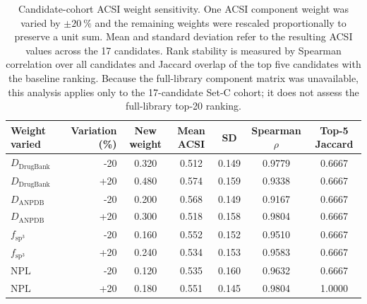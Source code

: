
\begin{table}[htbp]
\centering
\caption{Candidate-cohort ACSI weight sensitivity. One ACSI component weight was varied by $\pm\qty{20}{\percent}$ and the remaining weights were rescaled proportionally to preserve a unit sum. Mean and standard deviation refer to the resulting ACSI values across the \num{17} candidates. Rank stability is measured by Spearman correlation over all candidates and Jaccard overlap of the top five candidates with the baseline ranking. Because the full-library component matrix was unavailable, this analysis applies only to the 17-candidate Set-C cohort; it does not assess the full-library top-20 ranking.}
\label{tab:s4_acsi_sensitivity}
\scriptsize
\begin{tabular}{l r S[table-format=1.3] S[table-format=1.3] S[table-format=1.3] S[table-format=1.4] S[table-format=1.4]}
\toprule
Weight varied & Variation (\%) & {New weight} & {Mean ACSI} & {SD} & {Spearman $\rho$} & {Top-5 Jaccard} \\
\midrule
$D_{\mathrm{DrugBank}}$ & -20 & 0.320 & 0.512 & 0.149 & 0.9779 & 0.6667 \\
$D_{\mathrm{DrugBank}}$ & +20 & 0.480 & 0.574 & 0.159 & 0.9338 & 0.6667 \\
$D_{\mathrm{ANPDB}}$    & -20 & 0.200 & 0.568 & 0.149 & 0.9167 & 0.6667 \\
$D_{\mathrm{ANPDB}}$    & +20 & 0.300 & 0.518 & 0.158 & 0.9804 & 0.6667 \\
$f_{\mathrm{sp}^3}$      & -20 & 0.160 & 0.552 & 0.152 & 0.9510 & 0.6667 \\
$f_{\mathrm{sp}^3}$      & +20 & 0.240 & 0.534 & 0.153 & 0.9583 & 0.6667 \\
$\mathrm{NPL}$            & -20 & 0.120 & 0.535 & 0.160 & 0.9632 & 0.6667 \\
$\mathrm{NPL}$            & +20 & 0.180 & 0.551 & 0.145 & 0.9804 & 1.0000 \\
\bottomrule
\end{tabular}
\end{table}
